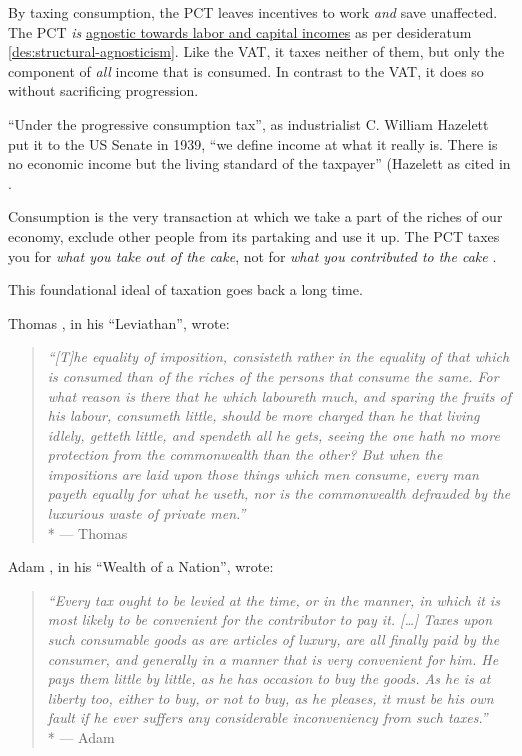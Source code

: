By taxing consumption, the PCT leaves incentives to work \emph{and} save unaffected.
The PCT \emph{is} \hyperref[des:structural-agnosticism]{agnostic towards labor and capital incomes} as per desideratum \ref{des:structural-agnosticism}.
Like the VAT, it taxes neither of them, but only the component of \emph{all} income that is consumed.
In contrast to the VAT, it does so without sacrificing progression.

``Under the progressive consumption tax'', as industrialist C.
William Hazelett put it to the US Senate in 1939, ``we define income at what it really is.
There is no economic income but the living standard of the taxpayer'' (Hazelett as cited in \citep[15]{Bank2004}.

Consumption is the very transaction at which we take a part of the riches of our economy, exclude other people from its partaking and use it up.
The PCT taxes you for \emph{what you take out of the cake}, not for \emph{what you contributed to the cake} \citep[58]{Seidman1997}.

This foundational ideal of taxation goes back a long time.

Thomas \citeauthor{Hobbes-1651-aa}, in his ``Leviathan'', wrote:

\begin{quotation}
	\emph{``[T]he equality of imposition, consisteth rather in the equality of that which is consumed than of the riches of the persons that consume the same.
	For what reason is there that he which laboureth much, and sparing the fruits of his labour, consumeth little, should be more charged than he that living idlely, getteth little, and spendeth all he gets, seeing the one hath no more protection from the commonwealth than the other?
	But when the impositions are laid upon those things which men consume, every man payeth equally for what he useth, nor is the commonwealth defrauded by the luxurious waste of private men.''}
	\\*
	--- Thomas \citet[386]{Hobbes-1651-aa}
\end{quotation}

Adam \citeauthor{Smith-1776-lq}, in his ``Wealth of a Nation'', wrote:

\begin{quotation}
	\emph{``Every tax ought to be levied at the time, or in the manner, in which it is most likely to be convenient for the contributor to pay it.
	[\ldots]
	Taxes upon such consumable goods as are articles of luxury, are all finally paid by the consumer, and generally in a manner that is very convenient for him.
	He pays them little by little, as he has occasion to buy the goods.
	As he is at liberty too, either to buy, or not to buy, as he pleases, it must be his own fault if he ever suffers any considerable inconveniency from such taxes.''}
	\\*
	--- Adam \citet[778]{Smith-1776-lq}
\end{quotation}

